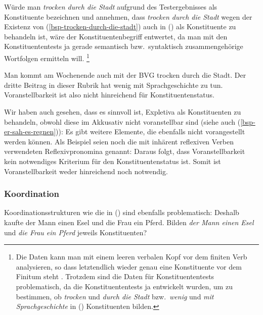 Würde man \emph{trocken durch die Stadt} aufgrund des Testergebnisses als Konstituente bezeichnen
und annehmen, dass \emph{trocken durch die Stadt} wegen der Existenz von (\ref{bsp-trocken-durch-die-stadt})
auch in () als Konstituente zu behandeln ist, 
wäre der Konstituentenbegriff entwertet, da man mit den Konstituententests ja gerade semantisch
bzw.\ syntaktisch zusammengehörige Wortfolgen ermitteln will.%
\footnote{
  Die Daten kann man mit einem leeren verbalen Kopf vor dem finiten Verb analysieren,
  so dass letztendlich wieder genau eine Konstituente vor dem Finitum steht \citep{Mueller2005d}.
  Trotzdem sind die Daten für Konstituententests problematisch, da die Konstituententests
  ja entwickelt wurden, um zu bestimmen, ob \zb \emph{trocken} und \emph{durch die Stadt}
  bzw.\ \emph{wenig} und \emph{mit Sprachgeschichte} in () Konstituenten bilden.%
}

\eal
\ex Man kommt am Wochenende auch mit der BVG trocken durch die Stadt.
\ex Der dritte Beitrag in dieser Rubrik hat wenig mit Sprachgeschichte zu tun.
\zl
Voranstellbarkeit ist also nicht hinreichend für Konstituentenstatus.

Wir haben auch gesehen, dass es sinnvoll ist, Expletiva als Konstituenten zu behandeln,
obwohl diese im Akkusativ nicht voranstellbar sind (siehe auch (\ref{bsp-er-sah-es-regnen})):
\eal
{}
\zl
Es gibt weitere Elemente, die ebenfalls nicht vorangestellt werden können. Als Beispiel
seien noch die mit inhärent reflexiven Verben verwendeten Reflexivpronomina genannt:
\eal
{}
\zl
Daraus folgt, dass Voranstellbarkeit kein notwendiges Kriterium für den Konstituentenstatus
ist. Somit ist Voranstellbarkeit weder hinreichend noch notwendig.


\subsubsection{Koordination}

Koordinationsstrukturen wie die in () sind ebenfalls problematisch:
\ea
\label{ex-gapping}
Deshalb kaufte der Mann einen Esel und die Frau ein Pferd.
\z
Bilden \emph{der Mann einen Esel} und \emph{die Frau ein Pferd} jeweils Konstituenten?

